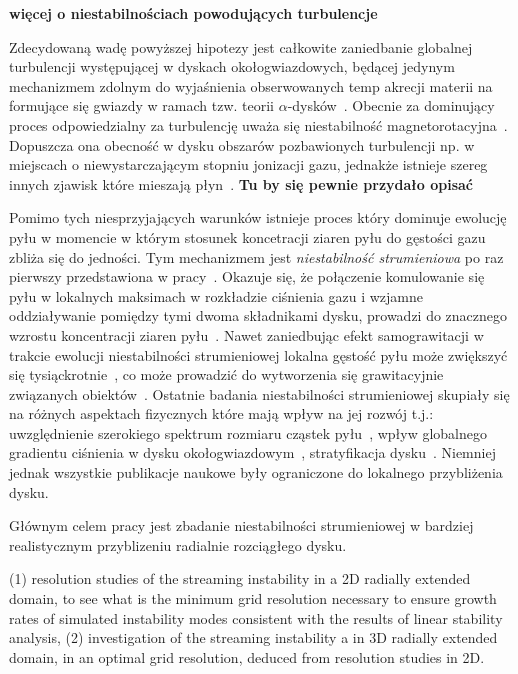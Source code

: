 {\bf więcej o niestabilnościach powodujących turbulencje}

\par Zdecydowaną wadę powyższej hipotezy jest całkowite zaniedbanie globalnej
turbulencji występującej w dyskach okołogwiazdowych, będącej jedynym
mechanizmem zdolnym do wyjaśnienia obserwowanych temp akrecji materii na
formujące się gwiazdy w ramach tzw. teorii $\alpha$-dysków~\citep{SS73}.
Obecnie za dominujący proces odpowiedzialny za turbulencję uważa się niestabilność
magnetorotacyjna~\citep{BH98}. Dopuszcza ona obecność w dysku obszarów pozbawionych
turbulencji np. w miejscach o niewystarczającym stopniu jonizacji gazu, jednakże
istnieje szereg innych zjawisk które mieszają płyn~\citep{LP10}.  {\bf Tu by się
pewnie przydało opisać}

\par Pomimo tych niesprzyjających warunków istnieje proces który dominuje
ewolucję pyłu w momencie w którym stosunek koncetracji ziaren pyłu do gęstości
gazu zbliża się do jedności. Tym mechanizmem jest {\it niestabilność
strumieniowa} po raz pierwszy przedstawiona w pracy~\cite{YG05}. Okazuje się, że
połączenie komulowanie się pyłu w lokalnych maksimach w rozkładzie ciśnienia
gazu i wzjamne oddziaływanie pomiędzy tymi dwoma składnikami dysku, prowadzi do
znacznego wzrostu koncentracji ziaren pyłu~\citep{J11}. Nawet zaniedbując efekt
samograwitacji w trakcie ewolucji niestabilności strumieniowej lokalna gęstość
pyłu może zwiększyć się tysiąckrotnie~\cite{JY07}, co może prowadzić do
wytworzenia się grawitacyjnie związanych obiektów~\cite{J07}. Ostatnie badania
niestabilności strumieniowej skupiały się na różnych aspektach fizycznych które
mają wpływ na jej rozwój t.j.: uwzględnienie szerokiego spektrum rozmiaru
cząstek pyłu~\cite{BS10a}, wpływ globalnego gradientu ciśnienia w dysku
okołogwiazdowym~\cite{BS10b}, stratyfikacja dysku~\cite{T12}. Niemniej jednak
wszystkie publikacje naukowe były ograniczone do lokalnego przybliżenia dysku.

Głównym celem pracy jest zbadanie niestabilności strumieniowej w bardziej
realistycznym przyblizeniu radialnie rozciągłego dysku.

(1) resolution studies of the streaming instability in a 2D radially extended
domain,  to see what is the minimum  grid resolution necessary to ensure growth
rates of  simulated instability modes consistent with the results of linear
stability analysis, (2) investigation of the streaming instability a in 3D
radially extended domain, in an optimal  grid resolution,  deduced from
resolution studies in 2D.

